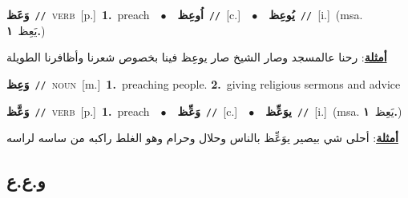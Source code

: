 \documentclass[10pt,a4paper,twoside]{article} %
\begin{document}
\begin{multicols}{2}
{\setlength\topsep{0pt}\textbf{\foreignlanguage{arabic}{وَعَظ}}\ {\color{gray}\texttt{//}\color{black}}\ \textsc{verb}\ [p.]\ \textbf{1.}~preach\ \ $\bullet$\ \ \setlength\topsep{0pt}\textbf{\foreignlanguage{arabic}{اُوعِظ}}\ {\color{gray}\texttt{//}\color{black}}\ [c.]\ \ $\bullet$\ \ \setlength\topsep{0pt}\textbf{\foreignlanguage{arabic}{يُوعِظ}}\ {\color{gray}\texttt{//}\color{black}}\ [i.]\ \color{gray}(msa. \foreignlanguage{arabic}{يَعِظ}~\foreignlanguage{arabic}{\textbf{١.}})\color{black}\  \begin{flushright}\color{gray}\foreignlanguage{arabic}{\textbf{\underline{\foreignlanguage{arabic}{أمثلة}}}: رحنا عالمسجد وصار الشيخ صار يوعِظ فينا بخصوص شعرنا وأظافرنا الطويلة}\end{flushright}\color{black}} \vspace{2mm}

{\setlength\topsep{0pt}\textbf{\foreignlanguage{arabic}{وَعِظ}}\ {\color{gray}\texttt{//}\color{black}}\ \textsc{noun}\ [m.]\ \textbf{1.}~preaching people.  \textbf{2.}~giving religious sermons and advice\ } \vspace{2mm}

{\setlength\topsep{0pt}\textbf{\foreignlanguage{arabic}{وَعَّظ}}\ {\color{gray}\texttt{//}\color{black}}\ \textsc{verb}\ [p.]\ \textbf{1.}~preach\ \ $\bullet$\ \ \setlength\topsep{0pt}\textbf{\foreignlanguage{arabic}{وَعِّظ}}\ {\color{gray}\texttt{//}\color{black}}\ [c.]\ \ $\bullet$\ \ \setlength\topsep{0pt}\textbf{\foreignlanguage{arabic}{يوَعِّظ}}\ {\color{gray}\texttt{//}\color{black}}\ [i.]\ \color{gray}(msa. \foreignlanguage{arabic}{يَعِظ}~\foreignlanguage{arabic}{\textbf{١.}})\color{black}\  \begin{flushright}\color{gray}\foreignlanguage{arabic}{\textbf{\underline{\foreignlanguage{arabic}{أمثلة}}}: أحلى شي بيصير يوَعِّظ بالناس وحلال وحرام وهو الغلط راكبه من ساسه لراسه}\end{flushright}\color{black}} \vspace{2mm}

\vspace{-3mm}
\subsection*{\color{blue}\foreignlanguage{arabic}{و.ع.ع}\color{blue}{}} 


\end{multicols}
\end{document}
